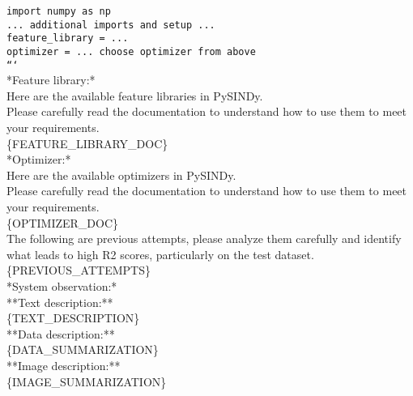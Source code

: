 \documentclass{article}
\begin{document}
\begin{prompt}[H]
\begin{tcolorbox}[promptbox, width=\textwidth]
\texttt{import numpy as np}\\
\texttt{... additional imports and setup ...}\\
\texttt{feature\_library = ...}\\
\texttt{optimizer = ... choose optimizer from above}\\
\texttt{```}\\
*Feature library:*\\
Here are the available feature libraries in PySINDy.\\
Please carefully read the documentation to understand how to use them to meet your requirements.\\
\{FEATURE\_LIBRARY\_DOC\}\\
*Optimizer:*\\
Here are the available optimizers in PySINDy.\\
Please carefully read the documentation to understand how to use them to meet your requirements.\\
\{OPTIMIZER\_DOC\}\\
The following are previous attempts, please analyze them carefully and identify what leads to high R2 scores, particularly on the test dataset.\\
\{PREVIOUS\_ATTEMPTS\}\\
*System observation:*\\
**Text description:**\\
\{TEXT\_DESCRIPTION\}\\
**Data description:**\\
\{DATA\_SUMMARIZATION\}\\
**Image description:**\\
\{IMAGE\_SUMMARIZATION\}


\end{tcolorbox}
\end{prompt}
\end{document}
